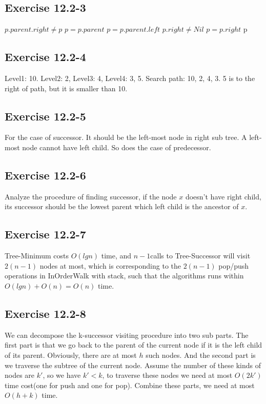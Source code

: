 \documentclass[12pt]{article}
\theoremstyle{definition}
\theoremstyle{remark}
\begin{document}
\subsection*{Exercise 12.2-3}
\begin{codebox}
\li \While $p.parent.right\ne p$ \label{li:while}
\li \quad $p=p.parent$
\li $p=p.parent.left$
\li \While $p.right\ne Nil$
\li \quad $p=p.right$
\li \Return p
\end{codebox}
\subsection*{Exercise 12.2-4}
Level1: 10. Level2: 2, Level3: 4, Level4: 3, 5. Search path: 10, 2, 4, 3. 5 is to the right of path, but it is smaller than 10.
\subsection*{Exercise 12.2-5}
For the case of successor. It should be the left-most node in right sub tree. A left-most node cannot have left child. So does the case of predecessor.
\subsection*{Exercise 12.2-6}
Analyze the procedure of finding successor, if the node $x$ doesn't have right child, its successor should be the lowest parent which left child is the ancestor of $x$.
\subsection*{Exercise 12.2-7}
Tree-Minimum costs $O(lgn)$ time, and $n-1$calls to Tree-Successor will visit $2(n-1)$ nodes at most, which is corresponding to the $2(n-1)$ pop/push operations in InOrderWalk with stack, such that the algorithms runs within $O(lgn)+O(n)=O(n)$ time.
\subsection*{Exercise 12.2-8}
We can decompose the k-successor visiting procedure into two sub parts. The first part is that we go back to the parent of the current node if it is the left child of its parent. Obviously, there are at most $h$ such nodes. And the second part is we traverse the subtree of the current node. Assume the number of these kinds of nodes are $k'$, so we have $k'<k$, to traverse these nodes we need at most $O(2k')$ time cost(one for push and one for pop). Combine these parts, we need at most $O(h+k)$ time.
\end{document}
